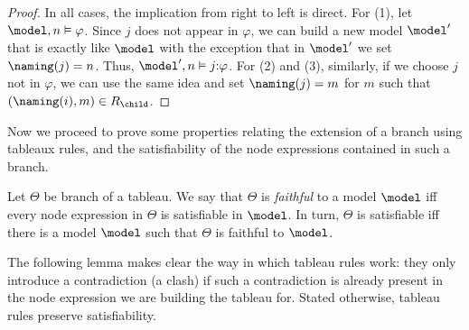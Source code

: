 \begin{proof}
	In all cases, the implication from right to left is direct. 
	For (1), let $\model,n\vDash\varphi$. Since $j$ does not appear in $\varphi$, we can build a new model $\model'$ that is exactly like $\model$ with the exception that in $\model'$ we set $\naming(j)=n$. Thus, $\model',n\vDash j{:}\varphi$. 
	For (2) and (3), similarly, if we choose $j$ not in $\varphi$, we can use the same idea and set $\naming(j)=m$ for $m$ such that $(\naming(i),m) \in R_{\child}$. 
\end{proof}





Now we proceed to prove some properties relating the extension of a branch using tableaux rules, and the satisfiability of the node expressions contained in such a branch.

\begin{defi}
    \label{def:faithful}
    \label{def:branch-sat}
    Let $\Theta$ be branch of a tableau.
    We say that $\Theta$ is \emph{faithful} to a model $\model$ iff every node expression in $\Theta$ is satisfiable in $\model$.
    In turn, $\Theta$ is satisfiable iff there is a model $\model$ such that $\Theta$ is faithful to $\model$.
\end{defi}

The following lemma makes clear the way in which tableau rules work: they only introduce a contradiction (a clash) if such a contradiction is already present in the node expression we are building the tableau for.
Stated otherwise, tableau rules preserve satisfiability. 

